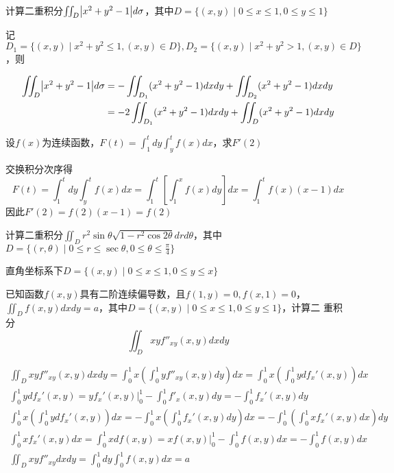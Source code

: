 \documentclass{article}
\begin{document}
\begin{examplle}[]
计算二重积分\(\iint_D\abs{x^2+y^2-1}d\sigma\)，其中\(D=\{(x,y)\mid0\le
   x\le1,0\le y\le1\}\)

记\(D_1=\{(x,y)\mid x^2+y^2\le1,(x,y)\in D\},D_2=\{(x,y)\mid
   x^2+y^2>1,(x,y)\in D\}\)，则

\begin{align*}
\iint_D\abs{x^2+y^2-1}d\sigma&=
-\iint_{D_1}(x^2+y^2-1)dxdy+\iint_{D_2}(x^2+y^2-1)dxdy\\
&=-2\iint_{D_1}(x^2+y^2-1)dxdy+\iint_D(x^2+y^2-1)dxdy
\end{align*}
\end{examplle}

\begin{examplle}[]
设\(f(x)\)为连续函数，\(F(t)=\int_1^tdy\int_y^tf(x)dx\)，求\(F'(2)\)

交换积分次序得
\begin{equation*}
F(t)=\int_1^tdy\int_y^tf(x)dx=\int_1^t[\int_1^xf(x)dy]dx=\int_1^tf(x)(x-1)dx
\end{equation*}
因此\(F'(2)=f(2)(x-1)=f(2)\)
\end{examplle}

\begin{examplle}[]
计算二重积分\(\iint_Dr^2\sin\theta\sqrt{1-r^2\cos2\theta}drd\theta\)，其中
\(D=\{(r,\theta)\mid 0\le r\le\sec\theta,0\le\theta\le\frac{\pi}{4}\}\)

直角坐标系下\(D=\{(x,y)\mid0\le x\le1,0\le y\le x\}\)
\end{examplle}

\begin{examplle}[]
已知函数\(f(x,y)\)具有二阶连续偏导数，且\(f(1,y)=0,f(x,1)=0\)，
\(\iint_Df(x,y)dxdy=a\)，其中\(D=\{(x,y)\mid0\le x\le1,0\le y\le1\}\)，计算二
重积分
\begin{equation*}
\iint_Dxyf''_{xy}(x,y)dxdy
\end{equation*}

\begin{gather*}
\iint_Dxyf''_{xy}(x,y)dxdy=\int_0^1x(\int_0^1yf''_{xy}(x,y)dy)dx=\int_0^1x
(\int_0^1ydf_x'(x,y))dx\\
\int_0^1ydf_x'(x,y)=yf_x'(x,y)\Big\rvert_0^1-\int_0^1f'_x(x,y)dy=
-\int_0^1f_x'(x,y)dy\\
\int_0^1x(\int_0^1ydf_x'(x,y))dx=-\int_0^1x(\int_0^1f_x'(x,y)dy)dx=
-\int_0^1(\int_0^1xf_x'(x,y)dx)dy\\
\int_0^1xf_x'(x,y)dx=\int_0^1xdf(x,y)=xf(x,y)\Big\rvert_0^1-\int_0^1f(x,y)dx=
-\int_0^1f(x,y)dx\\
\iint_Dxyf''_{xy}dxdy=\int_0^1dy\int_0^1f(x,y)dx=a
\end{gather*}
\end{examplle}
\end{document}
